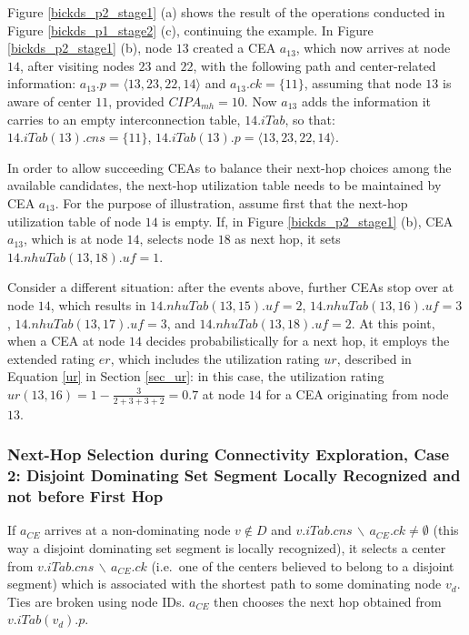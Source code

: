 

\exampleBegin

Figure \ref{bickds_p2_stage1} (a) shows the result of the operations conducted in Figure \ref{bickds_p1_stage2} (c), continuing the example. In Figure \ref{bickds_p2_stage1} (b), node $13$ created a CEA $a_{13}$, which now arrives at node $14$, after visiting nodes $23$ and $22$, with the following path and center-related information: $a_{13}.p=\langle 13,23,22,14 \rangle$ and $a_{13}.ck=\{11\}$, assuming that node $13$ is aware of center $11$, provided $CIPA_{mh}=10$. Now $a_{13}$ adds the information it carries to an empty interconnection table, $14.iTab$, so that: $14.iTab(13).cns=\{11\}$, $14.iTab(13).p=\langle 13,23,22,14 \rangle$. 

In order to allow succeeding CEAs to balance their next-hop choices among the available candidates, the next-hop utilization table needs to be maintained by CEA $a_{13}$. For the purpose of illustration, assume first that the next-hop utilization table of node $14$ is empty. If, in Figure \ref{bickds_p2_stage1} (b), CEA $a_{13}$, which is at node $14$, selects node $18$ as next hop, it sets $14.nhuTab(13,18).uf=1$. 

Consider a different situation: after the events above, further CEAs stop over at node $14$, which results in $14.nhuTab(13,15).uf=2$, $14.nhuTab(13,16).uf=3$, $14.nhuTab(13,17).uf=3$, and $14.nhuTab(13,18).uf=2$. At this point, when a CEA at node $14$ decides probabilistically for a next hop, it employs the extended rating $er$, which includes the utilization rating $ur$, described in Equation \ref{ur} in Section \ref{sec_ur}: in this case, the utilization rating $ur(13,16)=1-\frac{3}{2+3+3+2}=0.7$ at node $14$ for a CEA originating from node $13$.

\exampleEnd

\subsubsection{Next-Hop Selection during Connectivity Exploration, Case 2: Disjoint Dominating Set Segment Locally Recognized and not before First Hop} \label{sec_nhsd2} If $a_{CE}$ arrives at a non-dominating node $v \notin D$ and $v.iTab.cns \,\backslash\, a_{CE}.ck \neq \emptyset$ (this way a disjoint dominating set segment is locally recognized), it selects a center from $v.iTab.cns \,\backslash\, a_{CE}.ck$ (i.e.\ one of the centers believed to belong to a disjoint segment) which is associated with the shortest path to some dominating node $v_d$. Ties are broken using node IDs. $a_{CE}$ then chooses the next hop obtained from $v.iTab(v_d).p$. 

